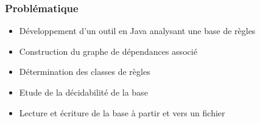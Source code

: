 
\begin{frame}
	\frametitle{Problématique}
	\begin{itemize}
		\item Développement d'un outil en Java analysant une base de règles
		\item Construction du graphe de dépendances associé
		\item Détermination des classes de règles 
		\item Etude de la décidabilité de la base
		\item Lecture et écriture de la base à partir et vers un fichier
	\end{itemize}
\end{frame}

